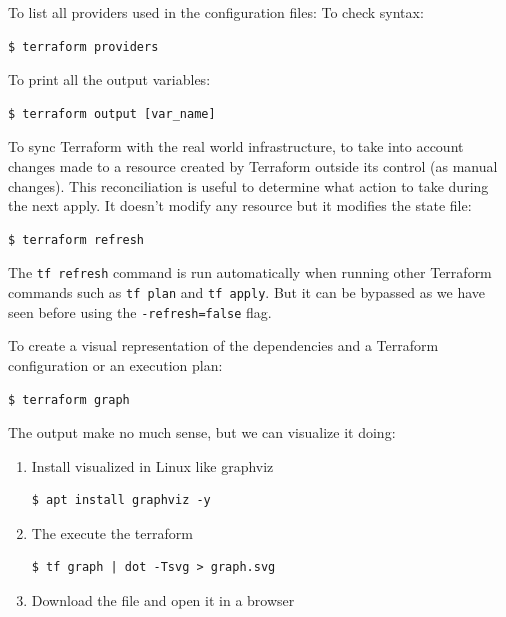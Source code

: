 \documentclass{article}
\newenvironment{blocktemplateI}[1]{%
    \tcolorbox[beamer,%
    noparskip,breakable,
    colframe=Violet,%
    colbacklower=Black,%
    title=#1]}%
    {\endtcolorbox}
\newenvironment{blocktemplateII}[1]{%
    \tcolorbox[beamer,%
    noparskip,breakable,
    colframe=Green,%
    colbacklower=LimeGreen!75!LightGreen,%
    title=#1]}%
    {\endtcolorbox}
\newenvironment{codetemplate}[1][]{%
  \mybasecolorbox[#1]
  \itshape
}{%
  \endmybasecolorbox
}
\begin{document}
To list all providers used in the configuration files:
To check syntax: 
\begin{codetemplate}{}
\begin{verbatim}
$ terraform providers
\end{verbatim}
\end{codetemplate}

To print all the output variables:
\begin{codetemplate}{}
\begin{verbatim}
$ terraform output [var_name]
\end{verbatim}
\end{codetemplate}

To sync Terraform with the real world infrastructure, to take into account changes made to a resource created by Terraform outside its control (as manual changes). This reconciliation is useful to determine what action to take during the next apply. It doesn't modify any resource but it modifies the state file:
\begin{codetemplate}{}
\begin{verbatim}
$ terraform refresh
\end{verbatim}
\end{codetemplate}

\begin{blocktemplateII}{Note}
The \verb+tf refresh+ command is run automatically when running other Terraform commands such as \verb+tf plan+ and \verb+tf apply+. But it can be bypassed as we have seen before using the \verb+-refresh=false+ flag.
\end{blocktemplateII}

To create a visual representation of the dependencies and a Terraform configuration or an execution plan:
\begin{codetemplate}{}
\begin{verbatim}
$ terraform graph
\end{verbatim}
\end{codetemplate}

\begin{blocktemplateI}{Note}
The output make no much sense, but we can visualize it doing:
\begin{enumerate}
    \item Install visualized in Linux like graphviz
\begin{codetemplate}{}
\begin{verbatim}
$ apt install graphviz -y
\end{verbatim}
\end{codetemplate}
    \item The execute the terraform
\begin{codetemplate}{}
\begin{verbatim}
$ tf graph | dot -Tsvg > graph.svg
\end{verbatim}
\end{codetemplate}
    \item Download the file and open it in a browser
\end{enumerate}
\end{blocktemplateI}
\end{document}
